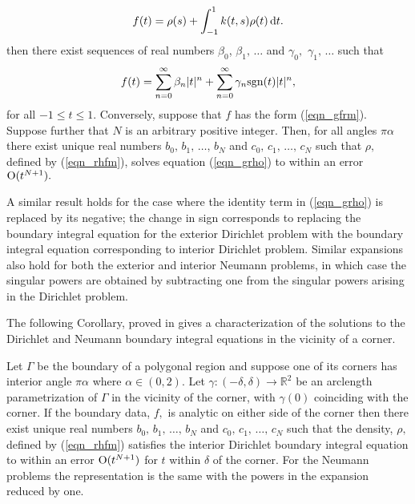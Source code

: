 \begin{theorem}
\begin{align}
f(t) = \rho(s) +\int_{-1}^1 k(t,s)  \rho(t)\,{\rm d}t.
\label{eqn_grho}
\end{align}
then there exist sequences of real numbers $\beta_0$, $\beta_1,\,\dots$ and $\gamma_0,$ $\gamma_1,\,\dots$ such that
\begin{align}
f(t) = \sum_{n=0}^\infty\beta_n |t|^n + \sum_{n=0}^\infty \gamma_n {\rm sgn}(t) |t|^n,
\label{eqn_gfrm}
\end{align}
for all $-1 \le t \le 1.$ Conversely, suppose that $f$ has the form (\ref{eqn_gfrm}). Suppose further that $N$ is an arbitrary positive integer. Then, for all angles $\pi \alpha$ there exist unique real numbers $b_0,\,b_1,\,\dots,\,b_N$ and $c_0,\,c_1,\,\dots,\,c_N$ such that $\rho,$ defined by (\ref{eqn_rhfm}), solves equation  (\ref{eqn_grho}) to within an error ${\rm O}(t^{N+1}).$ 
\end{theorem}
\begin{remark1}
A similar result holds for the case where the identity term in (\ref{eqn_grho}) is replaced by its negative; the change in sign corresponds to replacing the boundary integral equation for the exterior Dirichlet problem with the boundary integral equation corresponding to interior Dirichlet problem. Similar expansions also hold for both the exterior and interior Neumann problems, in which case the singular powers are obtained by subtracting one from the singular powers arising in the Dirichlet problem.
\end{remark1}


The following Corollary, proved in \cite{serkhacha} gives a characterization of the solutions to the Dirichlet and Neumann boundary integral equations in the vicinity of a corner.

\begin{corollary}
Let $\Gamma$ be the boundary of a polygonal region and suppose one of its corners has interior angle $\pi \alpha$ where $\alpha \in (0,2).$ Let $\gamma:(-\delta,\delta) \rightarrow \mathbb{R}^2$ be an arclength parametrization of $\Gamma$ in the vicinity of the corner, with $\gamma(0)$ coinciding with the corner. If the boundary data, $f,$ is analytic on either side of the corner then there exist unique real numbers $b_0,\,b_1,\,\dots,\,b_N$ and $c_0,\,c_1,\,\dots,\,c_N$ such that the density, $\rho,$ defined by (\ref{eqn_rhfm}) satisfies the interior Dirichlet boundary integral equation to within an error ${\rm O}(t^{N+1})$ for $t$ within $\delta$ of the corner. For the Neumann problems the representation is the same with the powers in the expansion reduced by one.
\end{corollary}
